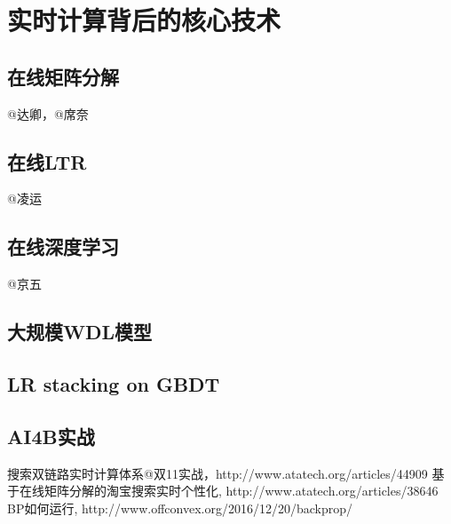 
\chapter{实时计算背后的核心技术}
\thispagestyle{empty}

\setlength{\fboxrule}{0pt}\setlength{\fboxsep}{0cm}
\noindent\shadowbox{
\begin{tcolorbox}[arc=0mm,colback=lightblue,colframe=darkblue,title=学习目标与要求]

\end{tcolorbox}}
\setlength{\fboxrule}{1pt}\setlength{\fboxsep}{4pt} 

\section{在线矩阵分解}
	@达卿，@席奈

\section{在线LTR} 
	@凌运 

\section {在线深度学习} 
	@京五

\section{大规模WDL模型} 

\section{LR stacking on GBDT} 

\section{AI4B实战} 

\begin{thebibliography}{99}
 搜索双链路实时计算体系@双11实战，http://www.atatech.org/articles/44909
 基于在线矩阵分解的淘宝搜索实时个性化, http://www.atatech.org/articles/38646
 BP如何运行, http://www.offconvex.org/2016/12/20/backprop/
\end{thebibliography}

 
